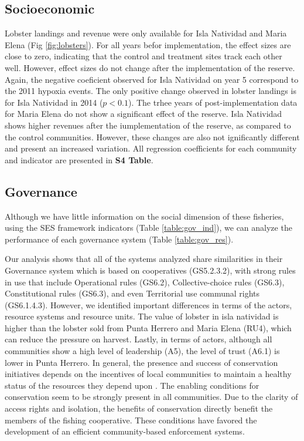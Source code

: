 \documentclass{frontiersSCNS}
\theoremstyle{definition}
\theoremstyle{definition}
\theoremstyle{definition}
\theoremstyle{remark}
\begin{document}
\subsection{Socioeconomic}\label{socioeconomic}

Lobster landings and revenue were only available for Isla Natividad and
Maria Elena (Fig \ref{fig:lobsters}). For all years befor
implementation, the effect sizes are close to zero, indicating that the
control and treatment sites track each other well. However, effect sizes
do not change after the implementation of the reserve. Again, the
negative coeficient observed for Isla Natividad on year 5 correspond to
the 2011 hypoxia events. The only positive change observed in lobster
landings is for Isla Natividad in 2014 (\(p < 0.1\)). The trhee years of
post-implementation data for Maria Elena do not show a significant
effect of the reserve. Isla Natividad shows higher revenues after the
iumplementation of the reserve, as compared to the control communities.
However, these changes are also not ignificantly different and present
an increased variation. All regression coefficients for each community
and indicator are presented in \textbf{S4 Table}.

\subsection{Governance}\label{governance}

Although we have little information on the social dimension of these
fisheries, using the SES framework indicators (Table
\ref{table:gov_ind}), we can analyze the performance of each governance
system (Table \ref{table:gov_res}).

Our analysis shows that all of the systems analyzed share similarities
in their Governance system which is based on cooperatives (GS5.2.3.2),
with strong rules in use that include Operational rules (GS6.2),
Collective-choice rules (GS6.3), Constitutional rules (GS6.3), and even
Territorial use communal rights (GS6.1.4.3). However, we identified
important differences in terms of the actors, resource systems and
resource units. The value of lobster in isla natividad is higher than
the lobster sold from Punta Herrero and Maria Elena (RU4), which can
reduce the pressure on harvest. Lastly, in terms of actors, although all
communities show a high level of leadership (A5), the level of trust
(A6.1) is lower in Punta Herrero. In general, the presence and success
of conservation initiatives depends on the incentives of local
communities to maintain a healthy status of the resources they depend
upon \citep{jupiter_2017}. The enabling conditions for conservation seem
to be strongly present in all communities. Due to the clarity of access
rights and isolation, the benefits of conservation directly benefit the
members of the fishing cooperative. These conditions have favored the
development of an efficient community-based enforcement systems.
\end{document}
